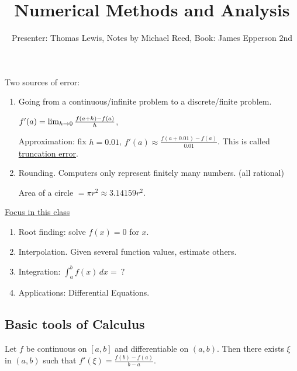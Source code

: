 \documentclass[]{article}
\author{Presenter: Thomas Lewis, Notes by Michael Reed, Book: James Epperson 2nd}
\title{Numerical Methods and Analysis}
\begin{document}
\maketitle



Two sources of error:
\begin{enumerate}
	\item Going from a continuous/infinite problem to a discrete/finite problem.
		\begin{example}
			$f'(a) = \lim_{h\rightarrow0} \frac{f(a+h)-f(a)}{h}$, 
			
			Approximation: fix $h=0.01$, $f'(a)\approx \frac{f(a+0.01)-f(a)}{0.01}$. This is called \ul{truncation error}.
		\end{example}
	\item Rounding. Computers only represent finitely many numbers. (all rational)
		\begin{example}
			Area of a circle $ = \pi r^2 \approx 3.14159r^2$.
		\end{example}
\end{enumerate}

\ul{Focus in this class}
\begin{enumerate}
	\item Root finding: solve $f(x)=0$ for $x$.
	\item Interpolation. Given several function values, estimate others.
	\item Integration: $\int_a^b f(x)\,dx =\ ?$
	\item Applications: Differential Equations.
\end{enumerate}

\subsection*{Basic tools of Calculus}

\begin{theorem}
	Let $f$ be continuous on $[a,b]$ and differentiable on $(a,b)$. Then there exists $\xi$ in $(a,b)$ such that $f'(\xi)=\frac{f(b)-f(a)}{b-a}$.
\end{theorem}
\end{document}
